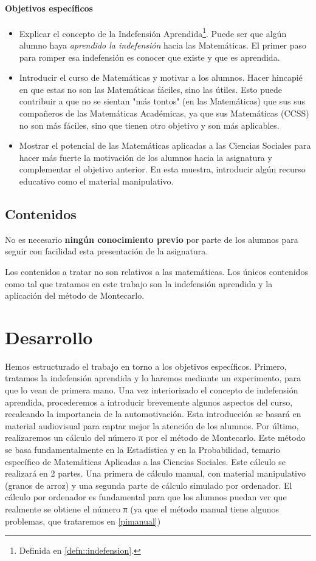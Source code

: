 \paragraph{Objetivos específicos}
\begin{itemize}
	\item Explicar el concepto de la Indefensión Aprendida\footnote{Definida en \ref{defn::indefension}.}. Puede ser que algún alumno haya \textit{aprendido la indefensión} hacia las Matemáticas. El primer paso para romper esa indefensión es conocer que existe y que es aprendida.
	\item Introducir el curso de Matemáticas y motivar a los alumnos.
	\subitem Hacer hincapié en que estas no son las Matemáticas fáciles, sino las útiles. Esto puede contribuir a que no se sientan "más tontos" (en las Matemáticas) que sus sus compañeros de las Matemáticas Académicas, ya que sus Matemáticas (CCSS) no son más fáciles, sino que tienen otro objetivo y son más aplicables.
	\item Mostrar el potencial de las Matemáticas aplicadas a las Ciencias Sociales para hacer más fuerte la motivación de los alumnos hacia la asignatura y complementar el objetivo anterior.
	\subitem En esta muestra, introducir algún recurso educativo como el material manipulativo.
\end{itemize}


\subsection{Contenidos}

No es necesario \textbf{ningún conocimiento previo} por parte de los alumnos para seguir con facilidad esta presentación de la asignatura.

Los contenidos a tratar no son relativos a las matemáticas. 
%
Los únicos contenidos como tal que tratamos en este trabajo son la indefensión aprendida y la aplicación del método de Montecarlo.

\section{Desarrollo}

Hemos estructurado el trabajo en torno a los objetivos específicos. 
%
Primero, tratamos la indefensión aprendida y lo haremos mediante un experimento, para que lo vean de primera mano.
%
Una vez interiorizado el concepto de indefensión aprendida, procederemos a introducir brevemente algunos aspectos del curso, recalcando la importancia de la automotivación.
%
Esta introducción se basará en material audiovisual para captar mejor la atención de los alumnos.
%
Por último, realizaremos un cálculo del número π por el método de Montecarlo. 
%
Este método se basa fundamentalmente en la Estadística y en la Probabilidad, temario específico de Matemáticas Aplicadas a las Ciencias Sociales.
%
Este cálculo se realizará en 2 partes. Una primera de cálculo manual, con material manipulativo (granos de arroz) y una segunda parte de cálculo simulado por ordenador.
%
El cálculo por ordenador es fundamental para que los alumnos puedan ver que realmente se obtiene el número π (ya que el método manual tiene algunos problemas, que trataremos en \ref{pimanual})

